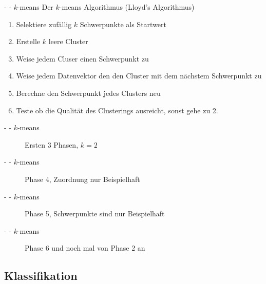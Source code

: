 \documentclass[fleqn,11pt,aspectratio=43]{beamer}
\begin{document}
\begin{frame}{\insertsectionhead - \insertsubsectionhead - $k$-means\cite{dwh}}
Der $k$-means Algorithmus (Lloyd's Algorithmus)
\begin{enumerate}
\item Selektiere zufällig $k$ Schwerpunkte als Startwert
\item Erstelle $k$ leere Cluster
\item Weise jedem Cluser einen Schwerpunkt zu
\item Weise jedem Datenvektor den den Cluster mit dem nächstem Schwerpunkt zu
\item Berechne den Schwerpunkt jedes Clusters neu
\item Teste ob die Qualität des Clusterings ausreicht, sonst gehe zu 2.
\end{enumerate}
\end{frame}

\begin{frame}{\insertsectionhead - \insertsubsectionhead - $k$-means}
\begin{figure}
\scalebox{1.1}{}
\caption{Ersten 3 Phasen, $k = 2$}
\end{figure}
\end{frame}

\begin{frame}{\insertsectionhead - \insertsubsectionhead - $k$-means}
\begin{figure}
\scalebox{1.1}{}
\caption{Phase 4, Zuordnung nur Beispielhaft}
\end{figure}
\end{frame}

\begin{frame}{\insertsectionhead - \insertsubsectionhead - $k$-means}
\begin{figure}
\scalebox{1.1}{}
\caption{Phase 5, Schwerpunkte sind nur Beispielhaft}
\end{figure}
\end{frame}

\begin{frame}{\insertsectionhead - \insertsubsectionhead - $k$-means}
\begin{figure}
\scalebox{1.1}{}
\caption{Phase 6 und noch mal von Phase 2 an}
\end{figure}
\end{frame}

\subsection{Klassifikation~}
\end{document}
